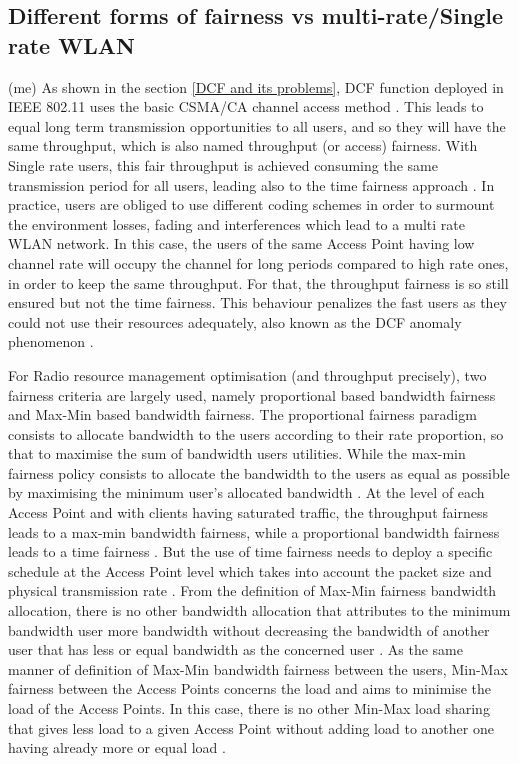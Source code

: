 \documentclass[journal,transmag]{IEEEtran}
\begin{document}
\subsection{Different forms of fairness vs multi-rate/Single rate WLAN} (me)
As shown in the section \ref{DCF and its problems}, DCF function deployed in IEEE 802.11 uses the basic CSMA/CA channel access method \cite{03performance_anomaly_DCF}. This leads to equal long term transmission opportunities to all users, and so they will have the same throughput, which is also named throughput (or access) fairness. With Single rate users, this fair throughput is achieved consuming the same transmission period for all users, leading also to the time fairness approach \cite{11proportional_fairness_power_control}. In practice, users are obliged to use different coding schemes in order to surmount the environment losses, fading and interferences which lead to a multi rate WLAN network. In this case, the users of the same Access Point having low channel rate will occupy the channel for long periods compared to high rate ones, in order to keep the same throughput. For that, the throughput fairness is so still ensured but not the time fairness. This behaviour penalizes the fast users as they could not use their resources adequately, also known as the DCF anomaly phenomenon \cite{03performance_anomaly_DCF,05performance_time_throughput_fairness,15time_fairness_MAC}. 

For Radio resource management optimisation (and throughput precisely), two fairness criteria are largely used, namely proportional based bandwidth fairness and Max-Min based bandwidth fairness. The proportional fairness paradigm consists to allocate bandwidth to the users according to their rate proportion, so that to maximise the sum of bandwidth users utilities. While the max-min fairness policy consists to allocate the bandwidth to the users as equal as possible by maximising the minimum user's allocated bandwidth \cite{11proportional_fairness_power_control}. At the level of each Access Point and with clients having saturated traffic, the throughput fairness leads to a max-min bandwidth fairness, while a proportional bandwidth fairness leads to a time fairness \cite{14AP_association_multirate_WLAN,15time_fairness_MAC}. But the use of time fairness needs to deploy a specific schedule at the Access Point level which takes into account the packet size and physical transmission rate \cite{16AP_association_optimisation_fairness}. 
From the definition of Max-Min fairness bandwidth allocation, there is no other bandwidth allocation that attributes to the minimum bandwidth user more bandwidth without decreasing the bandwidth of another user that has less or equal bandwidth as the concerned user \cite{04Fairness_load_balancing_WLAN}. As the same manner of definition of Max-Min bandwidth fairness between the users, Min-Max fairness between the Access Points concerns the load and aims to minimise the load of the Access Points. In this case, there is no other Min-Max load sharing that gives less load to a given Access Point without adding load to another one having already more or equal load \cite{11stability_fairness_APselection_game}.
\end{document}

